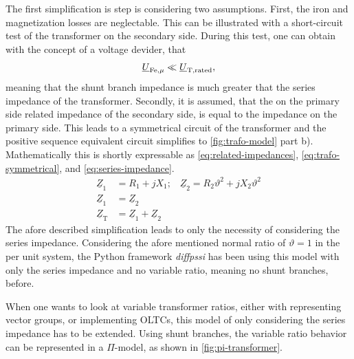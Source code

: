 The first simplification is step is considering two assumptions. 
First, the iron and magnetization losses are neglectable. 
This can be illustrated with a short-circuit test of the transformer on the secondary side. 
During this test, one can obtain with the concept of a voltage devider, that
\begin{align}
    \underline{U}_\mathrm{Fe, \mu} \ll \underline{U}_\mathrm{T,rated}, \notag
\end{align}
meaning that the shunt branch impedance is much greater that the series impedance of the transformer. 
Secondly, it is assumed, that the on the primary side related impedance of the secondary side, is equal to the impedance on the primary side. 
This leads to a symmetrical circuit of the transformer and the positive sequence equivalent circuit simplifies to \autoref{fig:trafo-model} part b). 
Mathematically this is shortly expressable as \autoref{eq:related-impedances}, \autoref{eq:trafo-symmetrical}, and \autoref{eq:series-impedance}. \autocite{machowski_2020,kundur_2022,milano_2010}
\begin{align}
    \underline{Z}_1 &= R_1 + jX_1\text{;}\quad\underline{Z}_2 = R_2 \vartheta^2 + jX_2 \vartheta^2 \label{eq:related-impedances} \\
    \underline{Z}_1 &= \underline{Z}_2 \label{eq:trafo-symmetrical} \\
    \underline{Z}_\mathrm{T} &= \underline{Z}_1 + \underline{Z}_2 \label{eq:series-impedance}
\end{align}
The afore described simplification leads to only the necessity of considering the series impedance. 
Considering the afore mentioned normal ratio of $\vartheta=1$ in the per unit system, the Python framework \textit{diffpssi} has been using this model with only the series impedance and no variable ratio, meaning no shunt branches, before.

When one wants to look at variable transformer ratios, either with representing vector groups, or implementing \acfp{OLTC}, this model of only considering the series impedance has to be extended. 
Using shunt branches, the variable ratio behavior can be represented in a $\Pi$-model, as shown in \autoref{fig:pi-transformer}. \autocite{machowski_2020,kundur_2022,milano_2010}

